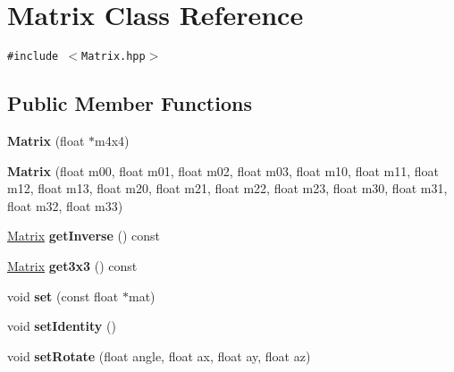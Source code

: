 \hypertarget{classm3g_1_1Matrix}{
\section{Matrix Class Reference}
\label{classm3g_1_1Matrix}
}
{\tt \#include $<$Matrix.hpp$>$}

\subsection*{Public Member Functions}
\begin{CompactItemize}
\item 
\hypertarget{classm3g_1_1Matrix_04fd433badb74a2d60395217701d4009}{
\textbf{Matrix} (float $\ast$m4x4)}
\label{classm3g_1_1Matrix_04fd433badb74a2d60395217701d4009}

\item 
\hypertarget{classm3g_1_1Matrix_2c2f600f3a4c1db4a0da0b57db8aebca}{
\textbf{Matrix} (float m00, float m01, float m02, float m03, float m10, float m11, float m12, float m13, float m20, float m21, float m22, float m23, float m30, float m31, float m32, float m33)}
\label{classm3g_1_1Matrix_2c2f600f3a4c1db4a0da0b57db8aebca}

\item 
\hypertarget{classm3g_1_1Matrix_b26f91cb9ae99fad922140d93b886009}{
\hyperlink{classm3g_1_1Matrix}{Matrix} \textbf{getInverse} () const }
\label{classm3g_1_1Matrix_b26f91cb9ae99fad922140d93b886009}

\item 
\hypertarget{classm3g_1_1Matrix_01a293246687a4ce841623945f6c993d}{
\hyperlink{classm3g_1_1Matrix}{Matrix} \textbf{get3x3} () const }
\label{classm3g_1_1Matrix_01a293246687a4ce841623945f6c993d}

\item 
\hypertarget{classm3g_1_1Matrix_ed427d2cd38fe4a0b23f7f80803b7fd5}{
void \textbf{set} (const float $\ast$mat)}
\label{classm3g_1_1Matrix_ed427d2cd38fe4a0b23f7f80803b7fd5}

\item 
\hypertarget{classm3g_1_1Matrix_382e6ad7e6721b121e510959e1011be3}{
void \textbf{setIdentity} ()}
\label{classm3g_1_1Matrix_382e6ad7e6721b121e510959e1011be3}

\item 
\hypertarget{classm3g_1_1Matrix_c4e04770db1fedff14c37b5e4e4a68c6}{
void \textbf{setRotate} (float angle, float ax, float ay, float az)}
\label{classm3g_1_1Matrix_c4e04770db1fedff14c37b5e4e4a68c6}


\end{CompactItemize}
